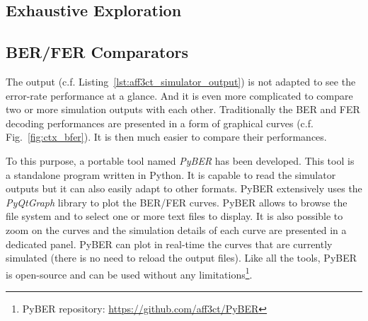 \subsection{Exhaustive Exploration}


\subsection{BER/FER Comparators} %


The \AFFECT output (c.f. Listing~\ref{lst:aff3ct_simulator_output}) is not
adapted to see the error-rate performance at a glance. And it is even more
complicated to compare two or more simulation outputs with each other.
Traditionally the BER and FER decoding performances are presented in a form of
graphical curves (c.f. Fig.~\ref{fig:ctx_bfer}). It is then much easier to
compare their performances.

To this purpose, a portable tool named \emph{PyBER} has been developed.
This tool is a standalone program written in Python. It is capable to read the
\AFFECT simulator outputs but it can also easily adapt to other formats. PyBER
extensively uses the \emph{PyQtGraph} library to plot the BER/FER curves. PyBER
allows to browse the file system and to select one or more text files to
display. It is also possible to zoom on the curves and the simulation details of
each curve are presented in a dedicated panel. PyBER can plot in real-time the
curves that are currently simulated (there is no need to reload the \AFFECT
output files). Like all the \AFFECT tools, PyBER is open-source and can be used
without any limitations\footnote{PyBER repository:
\url{https://github.com/aff3ct/PyBER}}.

